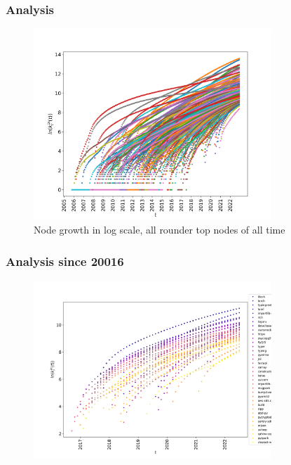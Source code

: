 \documentclass[fleqn]{beamer}
\begin{document}
    \begin{frame}
        \frametitle{Analysis}
        \begin{figure}[htpb]
            \centering
            \includegraphics[width=0.8\textwidth]{./pics/top_all_edge_growth.png}
            \caption{Node growth in log scale, all rounder top nodes of all
            time}
        \end{figure}
    \end{frame}

    \begin{frame}
        \frametitle{Analysis since 20016}
        \begin{figure}[htpb]
            \centering
            \includegraphics[width=0.8\textwidth]{./pics/deg_2016_growth.png}
        \end{figure}
    \end{frame}
\end{document}
